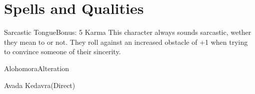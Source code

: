 \documentclass{ShadowTeXSR5}
\begin{document}
\section{Spells and Qualities}
\lipsum[1]
\begin{spell}{Sarcastic Tongue}{Bonus: 5 Karma}
This character always sounds sarcastic, wether they mean to or not. They roll against an increased obstacle of +1 when trying to convince someone of their sincerity.
\end{spell}
\begin{spell}{Alohomora}{Alteration}
\lipsum[2]
\end{spell}
\begin{spell}{Avada Kedavra}{(Direct)}
\lipsum[3]
\end{spell}
\end{document}
